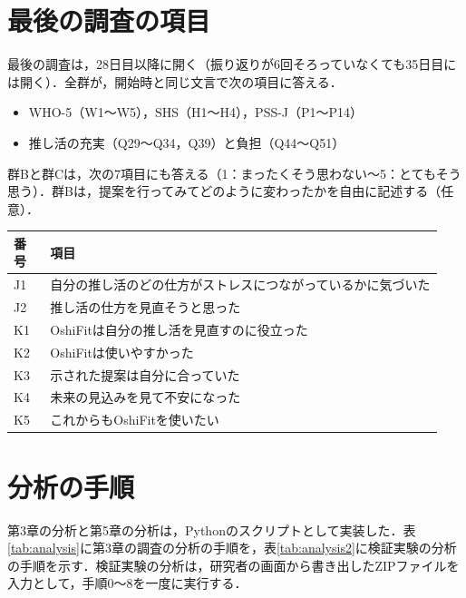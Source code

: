 \chapter{最後の調査の項目}
\label{app:final}
最後の調査は，28日目以降に開く（振り返りが6回そろっていなくても35日目には開く）．全群が，開始時と同じ文言で次の項目に答える．
\begin{itemize}
\item WHO-5（W1〜W5），SHS（H1〜H4），PSS-J（P1〜P14）
\item 推し活の充実（Q29〜Q34，Q39）と負担（Q44〜Q51）
\end{itemize}
群Bと群Cは，次の7項目にも答える（1：まったくそう思わない〜5：とてもそう思う）．群Bは，提案を行ってみてどのように変わったかを自由に記述する（任意）．
\begin{longtable}{@{}p{0.08\linewidth}p{0.86\linewidth}@{}}
\toprule 番号 & 項目 \\ \midrule \endhead \bottomrule \endfoot
J1 & 自分の推し活のどの仕方がストレスにつながっているかに気づいた \\
J2 & 推し活の仕方を見直そうと思った \\
K1 & OshiFitは自分の推し活を見直すのに役立った \\
K2 & OshiFitは使いやすかった \\
K3 & 示された提案は自分に合っていた \\
K4 & 未来の見込みを見て不安になった \\
K5 & これからもOshiFitを使いたい \\
\end{longtable}

\chapter{分析の手順}
\label{app:analysis}
第3章の分析と第5章の分析は，Pythonのスクリプトとして実装した．表\ref{tab:analysis}に第3章の調査の分析の手順を，表\ref{tab:analysis2}に検証実験の分析の手順を示す．検証実験の分析は，研究者の画面から書き出したZIPファイルを入力として，手順0〜8を一度に実行する．

